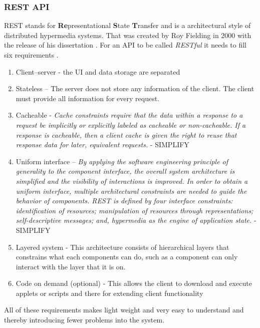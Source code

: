 \subsubsection{REST API}%
\label{sub:REST API}
REST stands for \textbf{Re}presentational \textbf{S}tate \textbf{T}ransfer and is a architectural style of distributed hypermedia systems. That was created by Roy Fielding in 2000 with the release of his dissertation \cite{fieldingFieldingDissertationCHAPTER}. For an API to be called \textit{RESTful} it needs to fill six requirements \cite{restfulapi.netWhatREST}.
\begin{enumerate}
  \item Client–server - the UI and data storage are separated
  \item Stateless –  The server does not store any information of the client. The client must provide all information for every request. 
  \item Cacheable - \textit{Cache constraints require that the data within a response to a request be implicitly or explicitly labeled as cacheable or non-cacheable. If a response is cacheable, then a client cache is given the right to reuse that response data for later, equivalent requests.} - SIMPLIFY
  \item Uniform interface – \textit{By applying the software engineering principle of generality to the component interface, the overall system architecture is simplified and the visibility of interactions is improved. In order to obtain a uniform interface, multiple architectural constraints are needed to guide the behavior of components. REST is defined by four interface constraints: identification of resources; manipulation of resources through representations; self-descriptive messages; and, hypermedia as the engine of application state.} - SIMPLIFY
  \item Layered system -  This architecture consists of hierarchical layers that constrains what each components can do, such as a component can only interact with the layer that it is on.
  \item  Code on demand (optional) - This allows the client to download and execute applets or scripts and there for extending client functionality
\end{enumerate}


 
All of these requirements makes light weight and very easy to understand and thereby introducing fewer problems into the system.  

